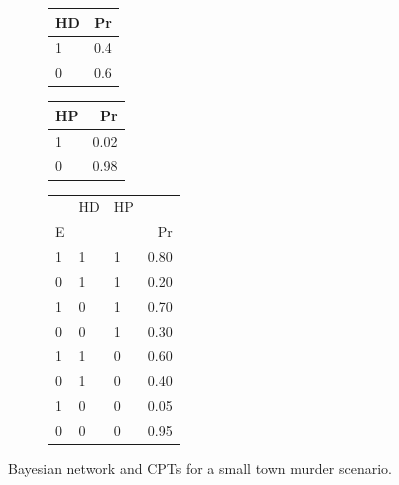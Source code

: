 \documentclass[
  10pt,
  dvipsnames,enabledeprecatedfontcommands]{scrartcl}
\begin{document}
\begin{figure}
\hspace{1cm} \hfill
\begin{subfigure}[!ht]{0.3\textwidth}

\begin{tabular}{lr}
\toprule
HD & Pr\\
\midrule
1 & 0.4\\
0 & 0.6\\
\bottomrule
\end{tabular}


\begin{tabular}{lr}
\toprule
HP & Pr\\
\midrule
1 & 0.02\\
0 & 0.98\\
\bottomrule
\end{tabular}


\begin{tabular}{lllr}
\toprule
\multicolumn{1}{c}{} & \multicolumn{1}{c}{HD} & \multicolumn{1}{c}{HP} & \multicolumn{1}{c}{} \\
E &  &  & Pr\\
\midrule
1 & 1 & 1 & 0.80\\
0 & 1 & 1 & 0.20\\
1 & 0 & 1 & 0.70\\
0 & 0 & 1 & 0.30\\
1 & 1 & 0 & 0.60\\
0 & 1 & 0 & 0.40\\
1 & 0 & 0 & 0.05\\
0 & 0 & 0 & 0.95\\
\bottomrule
\end{tabular}
\end{subfigure}
\caption{Bayesian network and \textsf{CPT}s for a small town murder scenario.}
\label{fig:Cpt}
\end{figure}
\end{document}
